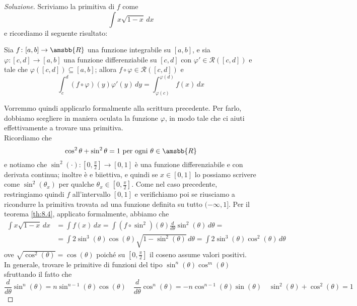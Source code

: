 \begin{proof}[Soluzione]
    Scriviamo la primitiva di $f$ come
    \[
    \int x\sqrt{1-x}\, dx
    \]
    e ricordiamo il seguente risultato:
    \begin{tcolorbox}
        \begin{theorem}
            \label{th:8.4}
            Sia $f\colon[a,b]\to\amsbb{R}$ una funzione integrabile su $[a,b]$, e sia $\varphi\colon [c,d]\to [a,b]$ una funzione differenziabile su $[c,d]$ con $\varphi'\in\mathscr{R}([c,d])$ e tale che $\varphi([c,d])\subseteq [a,b]$; allora $f\circ \varphi\in\mathscr{R}([c,d])$ e
            \[
            \int_c^d (f\circ \varphi)(y) \varphi'(y)\, dy = \int_{\varphi(c)}^{\varphi(d)} f(x)\, dx
            \]
        \end{theorem}
    \end{tcolorbox}
    Vorremmo quindi applicarlo formalmente alla scrittura precedente. Per farlo, dobbiamo scegliere in maniera oculata la funzione $\varphi$, in modo tale che ci aiuti effettivamente a trovare una primitiva.\\
    Ricordiamo che
    \[
    \cos^2\theta + \sin^2 \theta = 1 \ \text{per ogni} \ \theta\in\amsbb{R}
    \]
    e notiamo che $\sin^2(\cdot)\colon \left[0, \frac{\pi}{2}\right]\to [0,1]$ è una funzione differenziabile e con derivata continua; inoltre è e biiettiva, e quindi se $x\in[0,1]$ lo possiamo scrivere come $\sin^2(\theta_x)$ per qualche $\theta_x\in\left[0, \frac{\pi}{2}\right]$. 
    Come nel caso precedente, restringiamo quindi $f$ all'intervallo $[0,1]$ e verifichiamo poi se riusciamo a ricondurre la primitiva trovata ad una funzione definita su tutto $(-\infty, 1]$.
    Per il teorema \ref{th:8.4}, applicato formalmente, abbiamo che
    \[
    \begin{split}
        \int x\sqrt{1-x}\, dx & = \int f(x)\, dx = \int (f\circ \sin^2)(\theta) \frac{d}{d\theta}\sin^2(\theta)\, d\theta = \\
        & = \int 2\sin^3(\theta)\cos(\theta)\sqrt{1-\sin^2(\theta)}\, d\theta = \int 2\sin^3(\theta)\cos^2(\theta)\, d\theta
    \end{split}
    \]
    ove $\sqrt{\cos^2(\theta)} = \cos(\theta)$ poiché su $\left[0, \frac{\pi}{2}\right]$ il coseno assume valori positivi.\\
    In generale, trovare le primitive di funzioni del tipo $\sin^n(\theta)\cos^m(\theta)$ sfruttando il fatto che
    \[
    \frac{d}{d\theta}\sin^n(\theta) = n\sin^{n-1}(\theta)\cos(\theta) \quad \frac{d}{d\theta}\cos^n(\theta) = -n\cos^{n-1}(\theta)\sin(\theta) \quad \sin^2(\theta) + \cos^2(\theta) = 1
\]
\end{proof}
